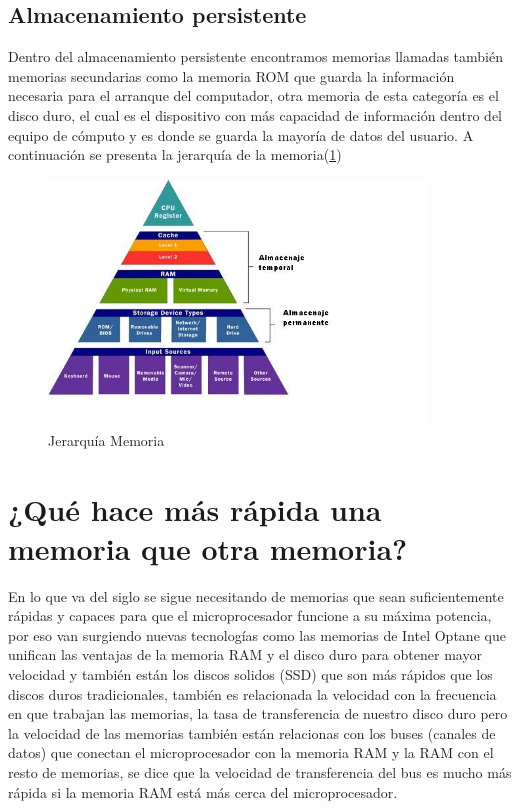 \documentclass{article}
\begin{document}
\subsection{Almacenamiento persistente}
Dentro del almacenamiento persistente encontramos memorias llamadas también memorias secundarias como la memoria ROM que guarda la información necesaria para el arranque del computador, otra memoria de esta categoría es el disco duro, el cual es el dispositivo con más capacidad de información dentro del equipo de cómputo y es donde se guarda la mayoría de datos del usuario.
 A continuación se presenta la jerarquía de la memoria(\ref{fig:Jerarquía Memoria})
\begin{figure}[h]
\includegraphics[width=10cm]{jq.JPG}
\centering
\caption{Jerarquía Memoria}
\label{fig:Jerarquía Memoria}
\end{figure}

\section{¿Qué hace más rápida una memoria que otra memoria?}
En lo que va del siglo se sigue necesitando de memorias que sean suficientemente rápidas y capaces para que el microprocesador funcione a su máxima potencia, por eso van surgiendo nuevas tecnologías como las memorias de Intel Optane que unifican las ventajas de la memoria RAM y el disco duro para obtener mayor velocidad y también están los discos solidos (SSD) que son más rápidos que los discos duros tradicionales, también es relacionada la velocidad con la frecuencia en que trabajan las memorias, la tasa de transferencia de nuestro disco duro pero la velocidad de las memorias también están relacionas con los buses (canales de datos) que conectan el microprocesador con la memoria RAM y la RAM con el resto de memorias, se dice que la velocidad de transferencia del bus es mucho más rápida si la memoria RAM está más cerca del microprocesador.


\end{document}
